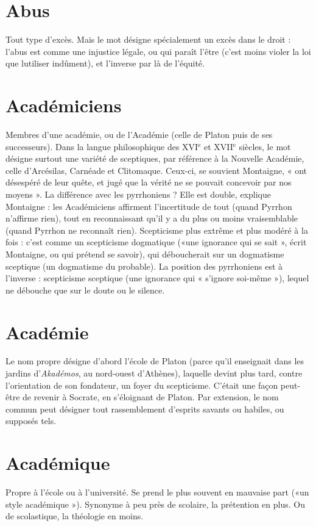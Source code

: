 \section{Abus}
Tout type d’excès. Mais le mot désigne spécialement un excès dans le
droit : l’abus est comme une injustice légale, ou qui paraît l’être (c’est
moins violer la loi que lutiliser indûment), et l'inverse par là de l'équité.

\section{Académiciens}
Membres d’une académie, ou de l’Académie (celle de
Platon puis de ses successeurs). Dans la langue philosophique
des {\footnotesize XVI$^\text{e}$} et {\footnotesize XVII$^\text{e}$} siècles,
le mot désigne surtout une variété de sceptiques,
par référence à la Nouvelle Académie, celle d’Arcésilas, Carnéade et Clitomaque.
Ceux-ci, se souvient Montaigne, « ont désespéré de leur quête, et jugé
que la vérité ne se pouvait concevoir par nos moyens ». La différence avec les
pyrrhoniens ? Elle est double, explique Montaigne : les Académiciens affirment
l'incertitude de tout (quand Pyrrhon n’affirme rien), tout en reconnaissant
qu’il y a du plus ou moins vraisemblable (quand Pyrrhon ne reconnaît rien).
Scepticisme plus extrême et plus modéré à la fois : c’est comme un scepticisme
dogmatique («une ignorance qui se sait », écrit Montaigne, ou qui prétend se
savoir), qui déboucherait sur un dogmatisme sceptique (un dogmatisme du
probable). La position des pyrrhoniens est à l’inverse : scepticisme sceptique
(une ignorance qui « s’ignore soi-même »), lequel ne débouche que sur le doute
ou le silence.

\section{Académie}
Le nom propre désigne d’abord l’école de Platon (parce qu’il
enseignait dans les jardins d’{\it Akadémos}, au nord-ouest d’Athènes),
laquelle devint plus tard, contre l'orientation de son fondateur, un foyer du
scepticisme. C’était une façon peut-être de revenir à Socrate, en s’éloignant de
Platon.
Par extension, le nom commun peut désigner tout rassemblement d’esprits
savants ou habiles, ou supposés tels.

\section{Académique}
Propre à l’école ou à l’université. Se prend le plus souvent
en mauvaise part («un style académique »). Synonyme à
peu près de scolaire, la prétention en plus. Ou de scolastique, la théologie en
moins.

